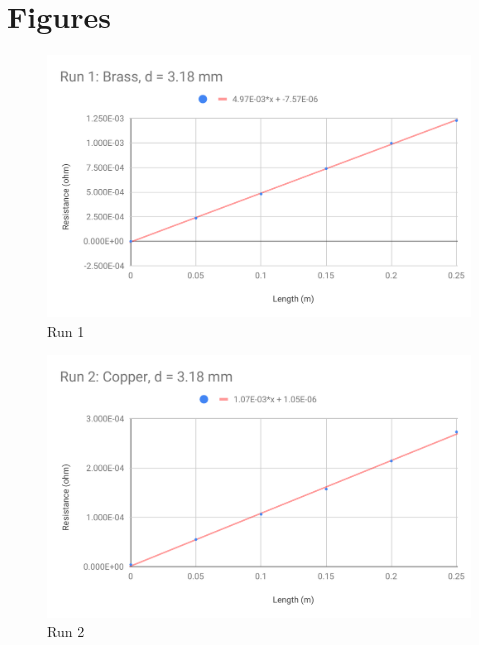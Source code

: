 \section{Figures}
\begin{figure}[ht]
	\centering
	\includegraphics[scale=0.74]{image/02-resistance/run1.pdf}
	\caption{Run 1}
	\label{figure.02.run.1}
\end{figure}
\begin{figure}[ht]
	\centering
	\includegraphics[scale=0.74]{image/02-resistance/run2.pdf}
	\caption{Run 2}
	\label{figure.02.run.2}
\end{figure}
